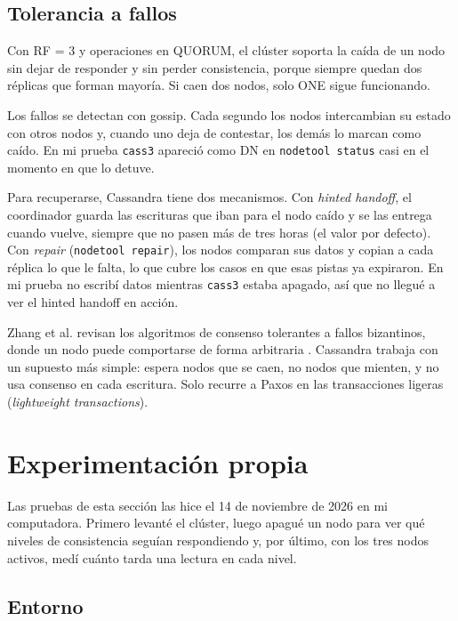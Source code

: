 \documentclass[12pt,a4paper]{article}
\begin{document}
\subsection{Tolerancia a fallos}

Con RF = 3 y operaciones en QUORUM, el clúster soporta la caída de un nodo sin dejar de responder y sin perder consistencia, porque siempre quedan dos réplicas que forman mayoría. Si caen dos nodos, solo ONE sigue funcionando.

Los fallos se detectan con gossip. Cada segundo los nodos intercambian su estado con otros nodos y, cuando uno deja de contestar, los demás lo marcan como caído. En mi prueba \texttt{cass3} apareció como DN en \texttt{nodetool status} casi en el momento en que lo detuve.

Para recuperarse, Cassandra tiene dos mecanismos. Con \textit{hinted handoff}, el coordinador guarda las escrituras que iban para el nodo caído y se las entrega cuando vuelve, siempre que no pasen más de tres horas (el valor por defecto). Con \textit{repair} (\texttt{nodetool repair}), los nodos comparan sus datos y copian a cada réplica lo que le falta, lo que cubre los casos en que esas pistas ya expiraron. En mi prueba no escribí datos mientras \texttt{cass3} estaba apagado, así que no llegué a ver el hinted handoff en acción.

Zhang et al. revisan los algoritmos de consenso tolerantes a fallos bizantinos, donde un nodo puede comportarse de forma arbitraria \cite{zhang2024byzantine}. Cassandra trabaja con un supuesto más simple: espera nodos que se caen, no nodos que mienten, y no usa consenso en cada escritura. Solo recurre a Paxos en las transacciones ligeras (\textit{lightweight transactions}).

\section{Experimentación propia}
\label{sec:experimento}

Las pruebas de esta sección las hice el 14 de noviembre de 2026 en mi computadora. Primero levanté el clúster, luego apagué un nodo para ver qué niveles de consistencia seguían respondiendo y, por último, con los tres nodos activos, medí cuánto tarda una lectura en cada nivel.

\subsection{Entorno}
\end{document}

